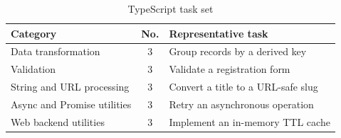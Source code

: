 \begin{table}[!h]
\caption{TypeScript task set}
\label{tab:tasks}
\centering
\scriptsize
\begin{tabular}{@{}p{}cp{}@{}}
\hline
\textbf{Category} & \textbf{No.} & \textbf{Representative task} \\
\hline
Data transformation & 3 & Group records by a derived key \\
Validation & 3 & Validate a registration form \\
String and URL processing & 3 & Convert a title to a URL-safe slug \\
Async and Promise utilities & 3 & Retry an asynchronous operation \\
Web backend utilities & 3 & Implement an in-memory TTL cache \\
\hline
\end{tabular}
\end{table}
